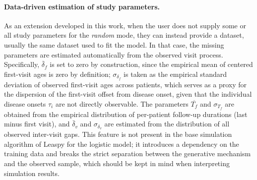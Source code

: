 \documentclass{rapportCS}
\begin{document}
\paragraph{Data-driven estimation of study parameters.}
As an extension developed in this work, when the user does not supply some or all study parameters for the \textit{random} mode, they can instead provide a dataset, usually the same dataset used to fit the model. In that case, the missing parameters are estimated automatically from the observed visit process. Specifically, $\bar{\delta}_f$ is set to zero by construction, since the empirical mean of centered first-visit ages is zero by definition; $\sigma_{\delta_f}$ is taken as the empirical standard deviation of observed first-visit ages across patients, which serves as a proxy for the dispersion of the first-visit offset from disease onset, given that the individual disease onsets $\tau_i$ are not directly observable. The parameters $\overline{T_f}$ and $\sigma_{T_f}$ are obtained from the empirical distribution of per-patient follow-up durations (last minus first visit), and $\bar{\delta}_v$ and $\sigma_{\delta_v}$ are estimated from the distribution of all observed inter-visit gaps. This feature is not present in the base simulation algorithm of Leaspy for the logistic model; it introduces a dependency on the training data and breaks the strict separation between the generative mechanism and the observed sample, which should be kept in mind when interpreting simulation results.

\end{document}
